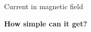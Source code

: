 \documentclass[compress]{beamer}
\begin{document}
{
\begin{frame}{Current in magnetic field}
%
%
%
%
%
%
%
%

\end{frame}
}



\begin{frame}[plain]

    \begin{center}
        \bf How simple can it get?
    \end{center}

\end{frame}
\end{document}
